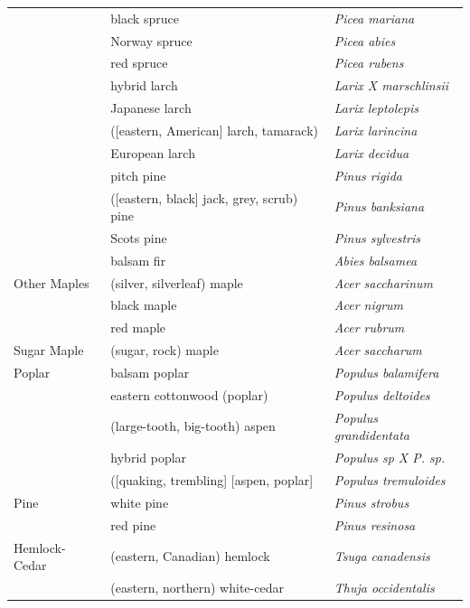 \documentclass{article}
\begin{document}
\begin{table}
{\begin{tabular}{lll}
      &    black spruce &   \emph{Picea mariana} \\
      &    Norway spruce &   \emph{Picea abies} \\
      &    red spruce &   \emph{Picea rubens} \\
      &    hybrid larch &   \emph{Larix X marschlinsii} \\
      &    Japanese larch &   \emph{Larix leptolepis} \\
      &    ([eastern, American] larch, tamarack) &   \emph{Larix larincina} \\
      &    European larch &   \emph{Larix decidua} \\
      &    pitch pine &   \emph{Pinus rigida} \\
      &    ([eastern, black] jack, grey, scrub) pine &   \emph{Pinus banksiana} \\
      &    Scots pine &   \emph{Pinus sylvestris} \\
      &    balsam fir &   \emph{Abies balsamea} \\
Other Maples        &     (silver, silverleaf) maple &   \emph{Acer saccharinum} \\
        &     black maple &   \emph{Acer nigrum} \\
        &     red maple &   \emph{Acer rubrum} \\
Sugar Maple        &     (sugar, rock) maple &   \emph{Acer saccharum} \\
Poplar        &     balsam poplar &   \emph{Populus balamifera} \\
       &     eastern cottonwood (poplar) &   \emph{Populus deltoides} \\
       &     (large-tooth, big-tooth) aspen &   \emph{Populus grandidentata} \\
       &     hybrid poplar &   \emph{Populus sp X P. sp.} \\
       &     ([quaking, trembling] [aspen, poplar] &   \emph{Populus tremuloides} \\
Pine        &     white pine &   \emph{Pinus strobus} \\
       &     red pine &   \emph{Pinus resinosa} \\
Hemlock-Cedar    &    (eastern, Canadian) hemlock &   \emph{Tsuga canadensis} \\
    &    (eastern, northern) white-cedar &   \emph{Thuja occidentalis} \\
\bottomrule
\end{tabular}
}%
\end{table}
\end{document}
